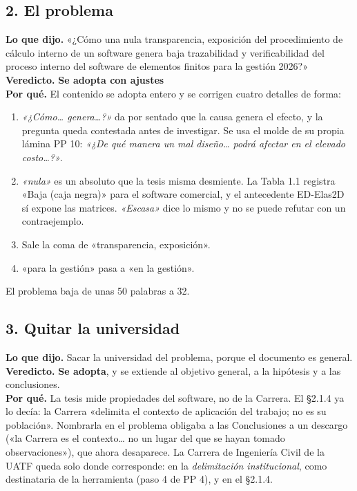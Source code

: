 \documentclass[11pt,a4paper]{article}
\newcommand{\adopta}{\textcolor{adopta}{\textbf{Se adopta}}}
\newcommand{\adapta}{\textcolor{adapta}{\textbf{Se adopta con ajustes}}}
\begin{document}
\subsection*{2. El problema}
\textbf{Lo que dijo.} «¿Cómo una nula transparencia, exposición del procedimiento de cálculo interno de un software genera baja trazabilidad y verificabilidad del proceso interno del software de elementos finitos para la gestión 2026?»\\
\textbf{Veredicto.} \adapta{}\\
\textbf{Por qué.} El contenido se adopta entero y se corrigen cuatro detalles de forma:
\begin{enumerate}[label=(\alph*)]
    \item \emph{«¿Cómo\ldots{} genera\ldots?»} da por sentado que la causa genera el efecto, y la pregunta queda contestada antes de investigar. Se usa el molde de su propia lámina PP 10: \emph{«¿De qué manera un mal diseño\ldots{} podrá afectar en el elevado costo\ldots?»}.
    \item \emph{«nula»} es un absoluto que la tesis misma desmiente. La Tabla 1.1 registra «Baja (caja negra)» para el software comercial, y el antecedente ED-Elas2D sí expone las matrices. \emph{«Escasa»} dice lo mismo y no se puede refutar con un contraejemplo.
    \item Sale la coma de «transparencia, exposición».
    \item «para la gestión» pasa a «en la gestión».
\end{enumerate}
El problema baja de unas 50 palabras a 32.

\subsection*{3. Quitar la universidad}
\textbf{Lo que dijo.} Sacar la universidad del problema, porque el documento es general.\\
\textbf{Veredicto.} \adopta{}, y se extiende al objetivo general, a la hipótesis y a las conclusiones.\\
\textbf{Por qué.} La tesis mide propiedades del software, no de la Carrera. El §2.1.4 ya lo decía: la Carrera «delimita el contexto de aplicación del trabajo; no es su población». Nombrarla en el problema obligaba a las Conclusiones a un descargo («la Carrera es el contexto\ldots{} no un lugar del que se hayan tomado observaciones»), que ahora desaparece. La Carrera de Ingeniería Civil de la UATF queda solo donde corresponde: en la \emph{delimitación institucional}, como destinataria de la herramienta (paso 4 de PP 4), y en el §2.1.4.
\end{document}
